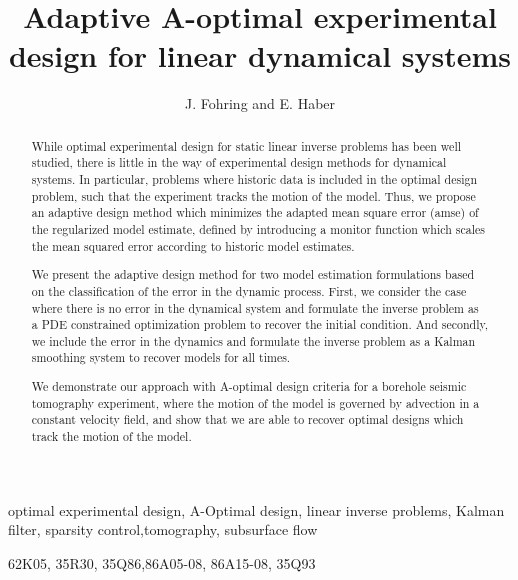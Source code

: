 \documentclass[final,leqno,onefignum,onetabnum]{siamltexmm}
\title{ Adaptive A-optimal experimental design for linear dynamical systems}
\author{J. Fohring and E. Haber }
\begin{document}
\maketitle
\newcommand{\slugmaster}{%
\slugger{juq}{2015}{xx}{x}{xx}}%


\begin{abstract}
While optimal experimental design for static linear inverse problems has been well studied, there is little in the way of experimental design methods for dynamical systems. 
In particular, problems where historic data is included in the optimal design problem, such that the experiment tracks the motion of the model. 
Thus, we propose an adaptive design method which minimizes the adapted mean square error (amse) of the regularized model estimate, defined by introducing a monitor function which scales the mean squared error according to historic model estimates. 

We present the adaptive design method for two model estimation formulations based on the classification of the error in the dynamic process. 
First, we consider the case where there is no error in the dynamical system and formulate the inverse problem as a PDE constrained optimization problem to recover the initial condition. 
And secondly, we include the error in the dynamics and formulate the inverse problem as a Kalman smoothing system to recover models for all times. 

We demonstrate our approach with A-optimal design criteria  for a borehole seismic tomography experiment, where the motion of the  model is governed by  advection in a constant velocity field, and show that we are able to recover optimal designs which track the motion of the model. 
\end{abstract}

\begin{keywords}optimal experimental design, A-Optimal design, linear inverse problems, Kalman filter, sparsity control,tomography, subsurface flow 
\end{keywords}

\begin{AMS}62K05, 35R30, 35Q86,86A05-08, 86A15-08, 35Q93 \end{AMS}

\pagestyle{myheadings}
\thispagestyle{plain}
%
%
\end{document}
